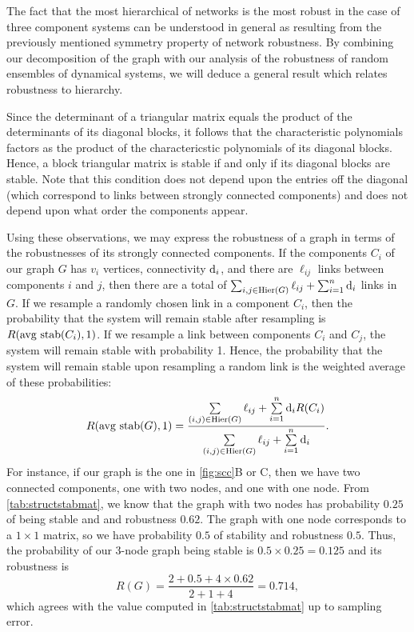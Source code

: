 The fact that the most hierarchical of networks is the most robust in the case of three component systems can be understood in general as resulting from the previously mentioned symmetry property of network robustness.  By combining our decomposition of the graph with our analysis of the robustness of random ensembles of dynamical systems, we will deduce a general result which relates robustness to hierarchy.

Since the determinant of a triangular matrix equals the product of the determinants of its diagonal blocks, it follows that the characteristic polynomials factors as the product of the charactericstic polynomials of its diagonal blocks.  Hence, a block triangular matrix is stable if and only if its diagonal blocks are stable.  Note that this condition does not depend upon the entries off the diagonal (which correspond to links between strongly connected components) and does not depend upon what order the components appear.

Using these observations, we may express the robustness of a graph in
terms of the robustnesses of its strongly connected components.  If
the components $C_i$ of our graph $G$ has $v_i$ vertices, connectivity
$\mathrm{d}_i$, and there are $\ell_{ij}$ links between components
$i$ and $j$, then there are a total of
$\sum_{i,j \in \mathrm{Hier}(G)} \ell_{ij} + \sum_{i=1}^n \mathrm{d}_i$
links in $G$.  If we resample a randomly chosen link in a component
$C_i$, then the probability that the system will remain stable after
resampling is $R(\hbox{avg stab} (C_i), 1)$.  If we resample a link
between components $C_i$ and $C_j$, the system will remain stable with
probability 1.  Hence, the probability that the system will remain
stable upon resampling a random link is the weighted average of these
probabilities:
\begin{align}\label{eq:sccrobustness}
R(\hbox{avg stab} (G), 1) =
\frac{\sum\limits_{(i,j) \in \mathrm{Hier}(G)} \ell_{ij} +
      \sum\limits_{i=1}^n \mathrm{d}_i R(C_i)}
     {\sum\limits_{(i,j) \in \mathrm{Hier}(G)} \ell_{ij} +
      \sum\limits_{i=1}^n \mathrm{d}_i}.
\end{align}
For instance, if our graph is the one in \ref{fig:scc}B or C, then we have two connected components, one with two nodes, and one with one node.  From \ref{tab:structstabmat}, we know that the graph with two nodes has probability $0.25$ of being stable and and robustness $0.62$.  The graph with one node corresponds to a $1 \times 1$ matrix, so we have probability $0.5$ of stability and robustness $0.5$.  Thus, the probability of our 3-node graph being stable is $0.5 \times 0.25 = 0.125$ and its robustness is
\[
R(G) = \frac{2 + 0.5 + 4 \times 0.62}{2 + 1 + 4} = 0.714,
\]
which agrees with the value computed in \ref{tab:structstabmat} up to
sampling error.

